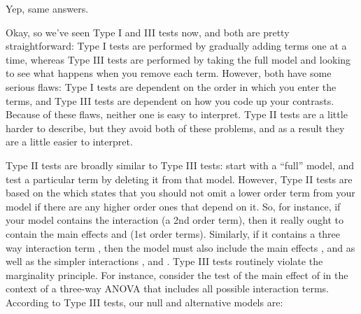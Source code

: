 Yep, same answers. 


Okay, so we've seen Type I and III tests now, and both are pretty straightforward: Type I tests are performed by gradually adding terms one at a time, whereas Type III tests are performed by taking the full model and looking to see what happens when you remove each term. However, both have some serious flaws: Type I tests are  dependent on the order in which you enter the terms, and Type III tests are  dependent on how you code up your contrasts. Because of these flaws, neither one is easy to interpret. Type II tests are a little harder to describe, but they avoid both of these problems, and as a result they are a little easier to interpret.

Type II tests are broadly similar to Type III tests: start with a ``full'' model, and test a particular term by deleting it from that model. However, Type II tests are based on the  which states that you should not omit a lower order term from your model if there are any higher order ones that depend on it. So, for instance, if your model contains the interaction  (a 2nd order term), then it really ought to contain the main effects  and  (1st order terms). Similarly, if it contains a three way interaction term , then the model must also include the main effects ,  and  as well as the simpler interactions ,  and . Type III tests routinely violate the marginality principle. For instance, consider the test of the main effect of  in the context of a three-way ANOVA that includes all possible interaction terms. According to Type III tests, our null and alternative models are:

